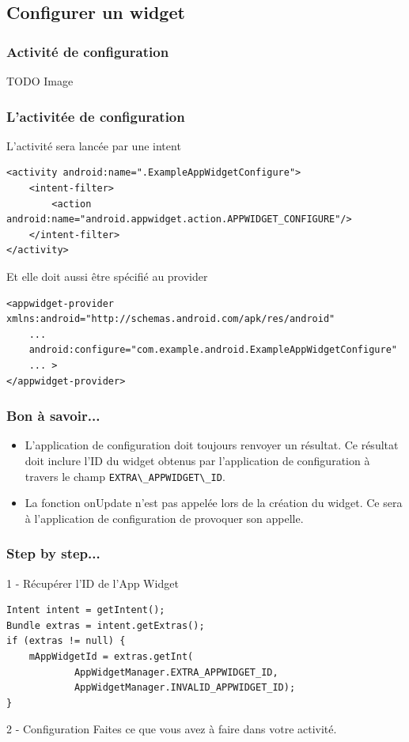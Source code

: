 \documentclass{beamer}
\begin{document}
\subsection{Configurer un widget}
\begin{frame}
\frametitle{Activité de configuration}
TODO Image
\end{frame}

\begin{frame}[fragile]
\frametitle{L'activitée de configuration}
\begin{block}{L'activité sera lancée par une intent}
\lstset{language=xml}
\begin{lstlisting}
<activity android:name=".ExampleAppWidgetConfigure">
    <intent-filter>
        <action android:name="android.appwidget.action.APPWIDGET_CONFIGURE"/>
    </intent-filter>
</activity>
\end{lstlisting}
\end{block}
\begin{block}{Et elle doit aussi être spécifié au provider}
\begin{lstlisting}
<appwidget-provider xmlns:android="http://schemas.android.com/apk/res/android"
    ...
    android:configure="com.example.android.ExampleAppWidgetConfigure" 
    ... >
</appwidget-provider>
\end{lstlisting}
\end{block}
\end{frame}

\begin{frame}
\frametitle{Bon à savoir...}
\begin{itemize}
\item L'application de configuration doit toujours renvoyer un résultat. Ce résultat doit inclure l'ID du widget obtenus par l'application de configuration à travers le champ \verb!EXTRA\_APPWIDGET\_ID!.
\item La fonction onUpdate n'est pas appelée lors de la création du widget. Ce sera à l'application de configuration de provoquer son appelle.
\end{itemize}

\end{frame}

\begin{frame}[fragile]
\frametitle{Step by step...}

\begin{block}{1 - Récupérer l'ID de l'App Widget}
\begin{lstlisting}
Intent intent = getIntent();
Bundle extras = intent.getExtras();
if (extras != null) {
    mAppWidgetId = extras.getInt(
            AppWidgetManager.EXTRA_APPWIDGET_ID, 
            AppWidgetManager.INVALID_APPWIDGET_ID);
}
\end{lstlisting}
\end{block}

\begin{block}{2 - Configuration}
Faites ce que vous avez à faire dans votre activité.
\end{block}
\end{frame}
\end{document}
